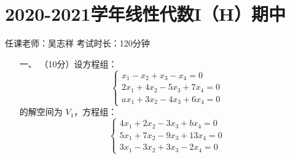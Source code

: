 \section*{2020-2021学年线性代数I（H）期中}

\begin{center}
    任课老师：吴志祥\hspace{4em} 考试时长：120分钟
\end{center}
\begin{enumerate}
	\item[一、]（10分）设方程组：
    \[\begin{cases}
        x_1-x_2+x_3-x_4=0 \\ 2x_1+4x_2-5x_3+7x_4=0\\ax_1+3x_2-4x_3+6x_4=0
    \end{cases}\]
    的解空间为 $V_1$，方程组：
    \[\begin{cases}
        4x_1+2x_2-3x_3+bx_4=0 \\ 5x_1+7x_2-9x_3+13x_4=0\\3x_1-3x_2+3x_3-2x_4=0
    \end{cases}\]


\end{enumerate}
